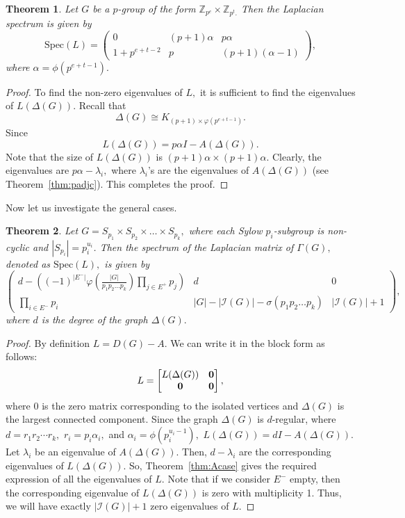 \documentclass[11pt]{article}
\def \Z {{\mathbb Z}}
\def \I {{\mathcal I}}
\newtheorem{theorem}{Theorem}[section]
\begin{document}
\begin{theorem}
    Let $G$ be a $p$-group of the form $\Z_{p^e}\times \Z_{p^t.}$ Then the Laplacian spectrum is given by
$$\mathrm{Spec}(L)=\begin{pmatrix}0&(p+1)\alpha&p\alpha\\
 1+p^{e+t-2}&p&(p+1)(\alpha-1)\end{pmatrix},$$ 
 where $\alpha=\phi(p^{e+t-1}).$ 
\end{theorem}
\begin{proof}
    To find the non-zero eigenvalues of $L,$ it is sufficient to find the eigenvalues of $L(\Delta(G)).$
    Recall that $$\Delta(G)\cong K_{
    (p+1)\times \varphi(p^{e+t-1})}.$$  Since $$L(\Delta(G))=p\alpha I-A(\Delta(G)).$$ Note that the size of $L(\Delta(G))$ is $(p+1)\alpha\times (p+1)\alpha.$ Clearly, the eigenvalues are $p\alpha-\lambda_i,$ where $\lambda_i$'s are the eigenvalues of $A(\Delta(G))$ (see Theorem~\ref{thm:padjc}). This completes the proof.
\end{proof}
Now let us investigate the general cases.\par
\begin{theorem}
    Let $G=S_{p_1}\times S_{p_2}\times\dots \times S_{p_k},$ where each Sylow $p_i$-subgroup is non-cyclic and $|S_{p_i}|=p_i^{u_i}$.  Then the spectrum of the Laplacian matrix of $\Gamma(G),$ denoted as $\mathrm{Spec}(L),$ is given by
    \begin{equation*}
        \begin{pmatrix}d-\left((-1)^{\left|E^-\right|} \varphi\left(\frac{|G|}{p_1p_2\dots p_k}\right)\prod\limits_{j\in E^+}p_j\right)&d&0\\ \prod\limits_{i\in E^-}p_i&|G|-|\I(G)|-\sigma(p_1p_2\dots p_k)&|\I(G)|+1\end{pmatrix},
    \end{equation*}
    where $d$ is the degree of the graph $\Delta(G).$
    
    \end{theorem}
    \begin{proof}
      By definition $L=D(G)-A.$ We can write it in the block form as follows: 
     $$L=\begin{bmatrix}L(\Delta(G))&\bf 0\\\bf 0&\bf 0\end{bmatrix},$$
     where $0$ is the zero matrix corresponding to the isolated vertices and $\Delta(G)$ is the largest connected component. 
     Since the graph $\Delta(G)$ is $d$-regular, where $d=r_1r_2\cdots r_k,$ $r_i=p_i\alpha_i,$ and $\alpha_i=\phi(p_i^{u_i-1}),$  $L(\Delta(G))=dI-A(\Delta(G)).$ Let $\lambda_i$  be an eigenvalue of $A(\Delta(G)).$ Then, $d-\lambda_i$ are the corresponding eigenvalues of $L(\Delta(G)).$ So, Theorem~\ref{thm:Acase} gives the required expression of all the eigenvalues of $L$. Note that if we consider $E^{-}$ empty, then the corresponding eigenvalue of $L(\Delta(G))$ is zero with multiplicity 1. Thus, we will have exactly $|\I(G)|+1$ zero eigenvalues of $L.$
        \end{proof}
\end{document}

